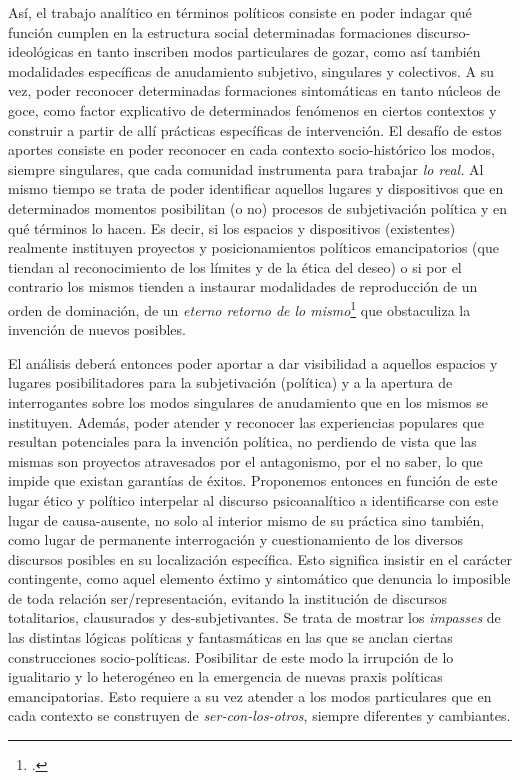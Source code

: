 Así, el trabajo analítico en términos políticos consiste en poder indagar qué función cumplen en la estructura social determinadas formaciones discurso-ideológicas en tanto inscriben modos particulares de gozar, como así también modalidades específicas de anudamiento subjetivo, singulares y colectivos. A su vez, poder reconocer determinadas formaciones sintomáticas en tanto núcleos de goce, como factor explicativo de determinados fenómenos en ciertos contextos y construir a partir de allí prácticas específicas de intervención. El desafío de estos aportes consiste en poder reconocer en cada contexto socio-histórico los modos, siempre singulares, que cada comunidad instrumenta para trabajar \emph{lo real.} Al mismo tiempo se trata de poder identificar aquellos lugares y dispositivos que en determinados momentos posibilitan (o no) procesos de subjetivación política y en qué términos lo hacen. Es decir, si los espacios y dispositivos (existentes) realmente instituyen proyectos y posicionamientos políticos emancipatorios (que tiendan al reconocimiento de los límites y de la ética del deseo) o si por el contrario los mismos tienden a instaurar modalidades de reproducción de un orden de dominación, de un \emph{eterno retorno de lo mismo}\footcite[]{@7104-FREUD1984} que obstaculiza la invención de nuevos posibles.

El análisis deberá entonces poder aportar a dar visibilidad a aquellos espacios y lugares posibilitadores para la subjetivación (política) y a la apertura de interrogantes sobre los modos singulares de anudamiento que en los mismos se instituyen. Además, poder atender y reconocer las experiencias populares que resultan potenciales para la invención política, no perdiendo de vista que las mismas son proyectos atravesados por el antagonismo, por el no saber, lo que impide que existan garantías de éxitos. Proponemos entonces en función de este lugar ético y político interpelar al discurso psicoanalítico a identificarse con este lugar de causa-ausente, no solo al interior mismo de su práctica sino también, como lugar de permanente interrogación y cuestionamiento de los diversos discursos posibles en su localización específica. Esto significa insistir en el carácter contingente, como aquel elemento éxtimo y sintomático que denuncia lo imposible de toda relación ser/representación, evitando la institución de discursos totalitarios, clausurados y des-subjetivantes. Se trata de mostrar los \emph{impasses} de las distintas lógicas políticas y fantasmáticas en las que se anclan ciertas construcciones socio-políticas. Posibilitar de este modo la irrupción de lo igualitario y lo heterogéneo en la emergencia de nuevas praxis políticas emancipatorias. Esto requiere a su vez atender a los modos particulares que en cada contexto se construyen de \emph{ser-con-los-otros}, siempre diferentes y cambiantes.

